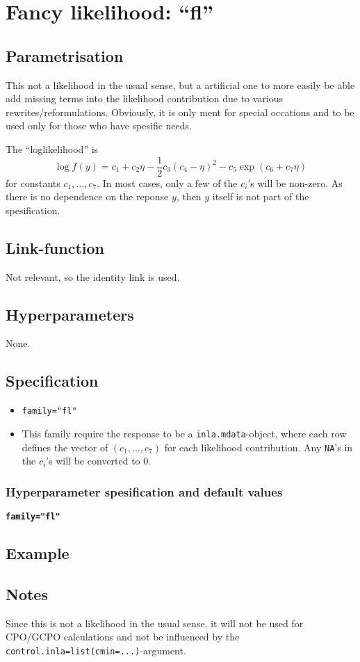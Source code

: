 \documentclass[a4paper,11pt]{article}
\begin{document}
\section*{Fancy likelihood: ``fl''}

\subsection*{Parametrisation}

This not a likelihood in the usual sense, but a artificial one to more
easily be able add missing terms into the likelihood contribution due
to various rewrites/reformulations. Obviously, it is only ment for
special occations and to be used only for those who have spesific
needs.

The ``loglikelihood'' is
\begin{displaymath}
    \log f(y) = c_1 + c_2 \eta -\frac{1}{2} c_3 (c_4 - \eta)^{2} -
    c_5 \exp(c_6 + c_7 \eta)
\end{displaymath}
for constants $c_1, \ldots, c_7$. In most cases, only a few of the
$c_i$'s will be non-zero. As there is no dependence on the reponse
$y$, then $y$ itself is not part of the spesification.

\subsection*{Link-function}

Not relevant, so the identity link is used.

\subsection*{Hyperparameters}

None.

\subsection*{Specification}

\begin{itemize}
\item \texttt{family="fl"}
\item This family require the response to be a
    \texttt{inla.mdata}-object, where each row defines the vector of
    $(c_1, \ldots, c_7)$ for each likelihood contribution. Any
    \texttt{NA}'s in the $c_i$'s will be converted to 0.
\end{itemize}

\subsubsection*{Hyperparameter spesification and default values}
\textbf{\texttt{family="fl"}}

\subsection*{Example}



\subsection*{Notes}

Since this is not a likelihood in the usual sense, it will not be used
for CPO/GCPO calculations and not be influenced by the
\texttt{control.inla=list(cmin=...)}-argument.
\end{document}
